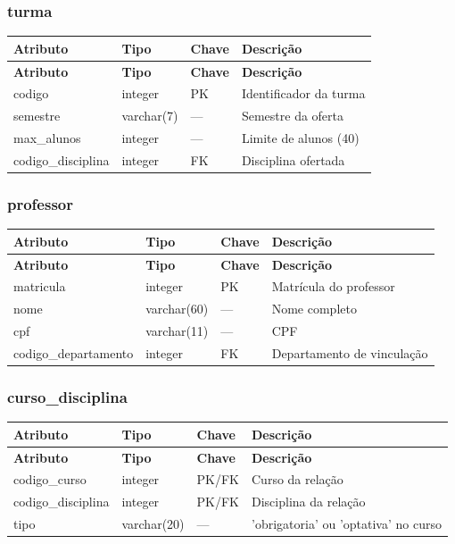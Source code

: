 \documentclass[12pt,a4paper]{article}
\begin{document}
\subsubsection{turma}

\begin{longtable}{@{}llll@{}}
\toprule
\textbf{Atributo} & \textbf{Tipo} & \textbf{Chave} & \textbf{Descrição} \\
\midrule
\endfirsthead
\toprule
\textbf{Atributo} & \textbf{Tipo} & \textbf{Chave} & \textbf{Descrição} \\
\midrule
\endhead
codigo & integer & PK & Identificador da turma \\
semestre & varchar(7) & --- & Semestre da oferta \\
max\_alunos & integer & --- & Limite de alunos (40) \\
codigo\_disciplina & integer & FK & Disciplina ofertada \\
\bottomrule
\end{longtable}

\subsubsection{professor}

\begin{longtable}{@{}llll@{}}
\toprule
\textbf{Atributo} & \textbf{Tipo} & \textbf{Chave} & \textbf{Descrição} \\
\midrule
\endfirsthead
\toprule
\textbf{Atributo} & \textbf{Tipo} & \textbf{Chave} & \textbf{Descrição} \\
\midrule
\endhead
matricula & integer & PK & Matrícula do professor \\
nome & varchar(60) & --- & Nome completo \\
cpf & varchar(11) & --- & CPF \\
codigo\_departamento & integer & FK & Departamento de vinculação \\
\bottomrule
\end{longtable}

\subsubsection{curso\_disciplina}

\begin{longtable}{@{}llll@{}}
\toprule
\textbf{Atributo} & \textbf{Tipo} & \textbf{Chave} & \textbf{Descrição} \\
\midrule
\endfirsthead
\toprule
\textbf{Atributo} & \textbf{Tipo} & \textbf{Chave} & \textbf{Descrição} \\
\midrule
\endhead
codigo\_curso & integer & PK/FK & Curso da relação \\
codigo\_disciplina & integer & PK/FK & Disciplina da relação \\
tipo & varchar(20) & --- & 'obrigatoria' ou 'optativa' no curso \\
\bottomrule
\end{longtable}
\end{document}
